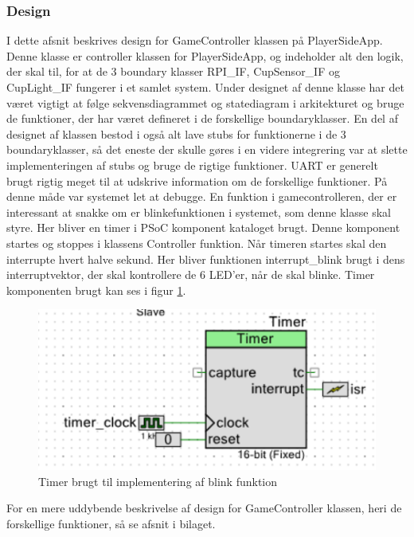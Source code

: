 \documentclass[Rapport/Playerside/GameController/GameController.tex]{subfiles}
\begin{document}
\subsubsection{Design}
I dette afsnit beskrives design for GameController klassen på PlayerSideApp. Denne klasse er controller klassen for PlayerSideApp, og indeholder alt den logik, der skal til, for at de 3 boundary klasser RPI\_IF, CupSensor\_IF og CupLight\_IF fungerer i et samlet system. Under designet af denne klasse har det været vigtigt at følge sekvensdiagrammet og statediagram i arkitekturet og bruge de funktioner, der har været defineret i de forskellige boundaryklasser. En del af designet af klassen bestod i også alt lave stubs for funktionerne i de 3 boundaryklasser, så det eneste der skulle gøres i en videre integrering  var at slette implementeringen af stubs og bruge de rigtige funktioner. UART er generelt brugt rigtig meget til at udskrive information om de forskellige funktioner. På denne måde var systemet let at debugge. En funktion i gamecontrolleren, der er interessant at snakke om er blinkefunktionen i systemet, som denne klasse skal styre. Her bliver en timer i PSoC komponent kataloget brugt. Denne komponent startes og stoppes i klassens Controller funktion. Når timeren startes skal den interrupte hvert halve sekund. Her bliver funktionen interrupt\_blink brugt i dens interruptvektor, der skal kontrollere de 6 LED'er, når de  skal blinke. Timer komponenten brugt kan ses i figur \ref{fig:Timer}.
\begin{figure}
    \centering 
    \includegraphics[width=0.5\linewidth]{Softwaredesign/GameController/graphic/gamecontroller_timer.PNG}
    \caption{Timer brugt til implementering af blink funktion}
    \label{fig:Timer}
\end{figure}
For en mere uddybende beskrivelse af design for GameController klassen, heri de forskellige funktioner, så se afsnit  i bilaget.
\end{document}
